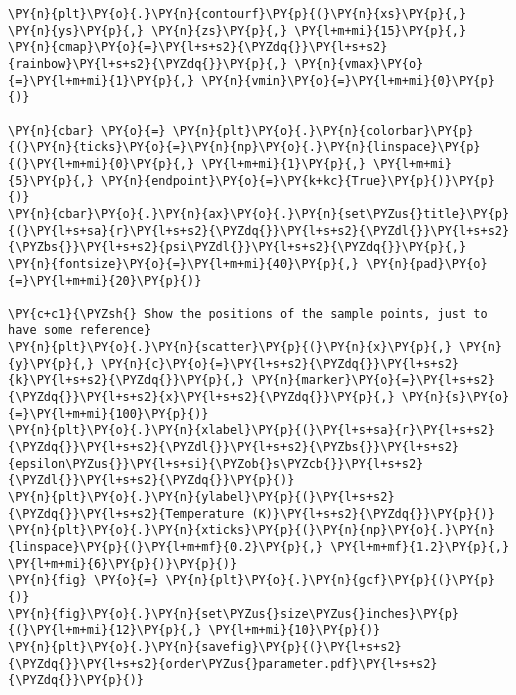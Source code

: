 \begin{tcolorbox}[breakable, size=fbox, boxrule=1pt, pad at break*=1mm,colback=cellbackground, colframe=cellborder]
\begin{Verbatim}[commandchars=\\\{\}]
\PY{n}{plt}\PY{o}{.}\PY{n}{contourf}\PY{p}{(}\PY{n}{xs}\PY{p}{,} \PY{n}{ys}\PY{p}{,} \PY{n}{zs}\PY{p}{,} \PY{l+m+mi}{15}\PY{p}{,} \PY{n}{cmap}\PY{o}{=}\PY{l+s+s2}{\PYZdq{}}\PY{l+s+s2}{rainbow}\PY{l+s+s2}{\PYZdq{}}\PY{p}{,} \PY{n}{vmax}\PY{o}{=}\PY{l+m+mi}{1}\PY{p}{,} \PY{n}{vmin}\PY{o}{=}\PY{l+m+mi}{0}\PY{p}{)}

\PY{n}{cbar} \PY{o}{=} \PY{n}{plt}\PY{o}{.}\PY{n}{colorbar}\PY{p}{(}\PY{n}{ticks}\PY{o}{=}\PY{n}{np}\PY{o}{.}\PY{n}{linspace}\PY{p}{(}\PY{l+m+mi}{0}\PY{p}{,} \PY{l+m+mi}{1}\PY{p}{,} \PY{l+m+mi}{5}\PY{p}{,} \PY{n}{endpoint}\PY{o}{=}\PY{k+kc}{True}\PY{p}{)}\PY{p}{)}
\PY{n}{cbar}\PY{o}{.}\PY{n}{ax}\PY{o}{.}\PY{n}{set\PYZus{}title}\PY{p}{(}\PY{l+s+sa}{r}\PY{l+s+s2}{\PYZdq{}}\PY{l+s+s2}{\PYZdl{}}\PY{l+s+s2}{\PYZbs{}}\PY{l+s+s2}{psi\PYZdl{}}\PY{l+s+s2}{\PYZdq{}}\PY{p}{,} \PY{n}{fontsize}\PY{o}{=}\PY{l+m+mi}{40}\PY{p}{,} \PY{n}{pad}\PY{o}{=}\PY{l+m+mi}{20}\PY{p}{)}

\PY{c+c1}{\PYZsh{} Show the positions of the sample points, just to have some reference}
\PY{n}{plt}\PY{o}{.}\PY{n}{scatter}\PY{p}{(}\PY{n}{x}\PY{p}{,} \PY{n}{y}\PY{p}{,} \PY{n}{c}\PY{o}{=}\PY{l+s+s2}{\PYZdq{}}\PY{l+s+s2}{k}\PY{l+s+s2}{\PYZdq{}}\PY{p}{,} \PY{n}{marker}\PY{o}{=}\PY{l+s+s2}{\PYZdq{}}\PY{l+s+s2}{x}\PY{l+s+s2}{\PYZdq{}}\PY{p}{,} \PY{n}{s}\PY{o}{=}\PY{l+m+mi}{100}\PY{p}{)}
\PY{n}{plt}\PY{o}{.}\PY{n}{xlabel}\PY{p}{(}\PY{l+s+sa}{r}\PY{l+s+s2}{\PYZdq{}}\PY{l+s+s2}{\PYZdl{}}\PY{l+s+s2}{\PYZbs{}}\PY{l+s+s2}{epsilon\PYZus{}}\PY{l+s+si}{\PYZob{}s\PYZcb{}}\PY{l+s+s2}{\PYZdl{}}\PY{l+s+s2}{\PYZdq{}}\PY{p}{)}
\PY{n}{plt}\PY{o}{.}\PY{n}{ylabel}\PY{p}{(}\PY{l+s+s2}{\PYZdq{}}\PY{l+s+s2}{Temperature (K)}\PY{l+s+s2}{\PYZdq{}}\PY{p}{)}
\PY{n}{plt}\PY{o}{.}\PY{n}{xticks}\PY{p}{(}\PY{n}{np}\PY{o}{.}\PY{n}{linspace}\PY{p}{(}\PY{l+m+mf}{0.2}\PY{p}{,} \PY{l+m+mf}{1.2}\PY{p}{,} \PY{l+m+mi}{6}\PY{p}{)}\PY{p}{)}
\PY{n}{fig} \PY{o}{=} \PY{n}{plt}\PY{o}{.}\PY{n}{gcf}\PY{p}{(}\PY{p}{)}
\PY{n}{fig}\PY{o}{.}\PY{n}{set\PYZus{}size\PYZus{}inches}\PY{p}{(}\PY{l+m+mi}{12}\PY{p}{,} \PY{l+m+mi}{10}\PY{p}{)}
\PY{n}{plt}\PY{o}{.}\PY{n}{savefig}\PY{p}{(}\PY{l+s+s2}{\PYZdq{}}\PY{l+s+s2}{order\PYZus{}parameter.pdf}\PY{l+s+s2}{\PYZdq{}}\PY{p}{)}
\end{Verbatim}
\end{tcolorbox}

    \begin{center}
    \end{center}
    
